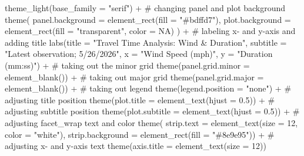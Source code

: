 \documentclass[
  letterpaper,
  DIV=11,
  numbers=noendperiod]{scrartcl}
\newenvironment{Shaded}{\begin{snugshade}}{\end{snugshade}}
\newcommand{\AttributeTok}[1]{\textcolor[rgb]{0.40,0.45,0.13}{#1}}
\newcommand{\CommentTok}[1]{\textcolor[rgb]{0.37,0.37,0.37}{#1}}
\newcommand{\ConstantTok}[1]{\textcolor[rgb]{0.56,0.35,0.01}{#1}}
\newcommand{\DecValTok}[1]{\textcolor[rgb]{0.68,0.00,0.00}{#1}}
\newcommand{\FloatTok}[1]{\textcolor[rgb]{0.68,0.00,0.00}{#1}}
\newcommand{\FunctionTok}[1]{\textcolor[rgb]{0.28,0.35,0.67}{#1}}
\newcommand{\NormalTok}[1]{\textcolor[rgb]{0.00,0.23,0.31}{#1}}
\newcommand{\SpecialCharTok}[1]{\textcolor[rgb]{0.37,0.37,0.37}{#1}}
\newcommand{\StringTok}[1]{\textcolor[rgb]{0.13,0.47,0.30}{#1}}
\newcounter{none} %
\begin{document}
\begin{Shaded}
\begin{Highlighting}[]
  \FunctionTok{theme\_light}\NormalTok{(}\AttributeTok{base\_family =} \StringTok{"serif"}\NormalTok{) }\SpecialCharTok{+}
  \CommentTok{\# changing panel and plot background}
  \FunctionTok{theme}\NormalTok{(}
    \AttributeTok{panel.background =} \FunctionTok{element\_rect}\NormalTok{(}\AttributeTok{fill =} \StringTok{"\#bdffd7"}\NormalTok{),}
    \AttributeTok{plot.background =} \FunctionTok{element\_rect}\NormalTok{(}\AttributeTok{fill =} \StringTok{"transparent"}\NormalTok{, }\AttributeTok{color =} \ConstantTok{NA}\NormalTok{)}
\NormalTok{  ) }\SpecialCharTok{+}
  \CommentTok{\# labeling x{-} and y{-}axis and adding title}
  \FunctionTok{labs}\NormalTok{(}\AttributeTok{title =} \StringTok{"Travel Time Analysis: Wind \& Duration"}\NormalTok{,}
       \AttributeTok{subtitle =} \StringTok{"Latest observation; 5/26/2026"}\NormalTok{,}
       \AttributeTok{x =} \StringTok{"Wind Speed (mph)"}\NormalTok{,}
       \AttributeTok{y =} \StringTok{"Duration (mm:ss)"}\NormalTok{) }\SpecialCharTok{+}
  \CommentTok{\# taking out the minor grid}
  \FunctionTok{theme}\NormalTok{(}\AttributeTok{panel.grid.minor =} \FunctionTok{element\_blank}\NormalTok{()) }\SpecialCharTok{+}
  \CommentTok{\# taking out major grid }
  \FunctionTok{theme}\NormalTok{(}\AttributeTok{panel.grid.major =} \FunctionTok{element\_blank}\NormalTok{()) }\SpecialCharTok{+}
  \CommentTok{\# taking out legend }
  \FunctionTok{theme}\NormalTok{(}\AttributeTok{legend.position =} \StringTok{"none"}\NormalTok{) }\SpecialCharTok{+}
  \CommentTok{\# adjusting title position}
  \FunctionTok{theme}\NormalTok{(}\AttributeTok{plot.title =} \FunctionTok{element\_text}\NormalTok{(}\AttributeTok{hjust =} \FloatTok{0.5}\NormalTok{)) }\SpecialCharTok{+}
  \CommentTok{\# adjusting subtitle position}
  \FunctionTok{theme}\NormalTok{(}\AttributeTok{plot.subtitle =} \FunctionTok{element\_text}\NormalTok{(}\AttributeTok{hjust =} \FloatTok{0.5}\NormalTok{)) }\SpecialCharTok{+}
  \CommentTok{\# adjusting facet\_wrap text and color}
  \FunctionTok{theme}\NormalTok{(}
  \AttributeTok{strip.text =} \FunctionTok{element\_text}\NormalTok{(}\AttributeTok{size =} \DecValTok{12}\NormalTok{, }\AttributeTok{color =} \StringTok{"white"}\NormalTok{),}
  \AttributeTok{strip.background =} \FunctionTok{element\_rect}\NormalTok{(}\AttributeTok{fill =} \StringTok{"\#8e9e95"}\NormalTok{)) }\SpecialCharTok{+}
  \CommentTok{\# adjusting x{-} and y{-}axis text}
  \FunctionTok{theme}\NormalTok{(}\AttributeTok{axis.title =} \FunctionTok{element\_text}\NormalTok{(}\AttributeTok{size =} \DecValTok{12}\NormalTok{))}
\end{Highlighting}
\end{Shaded}
\end{document}
